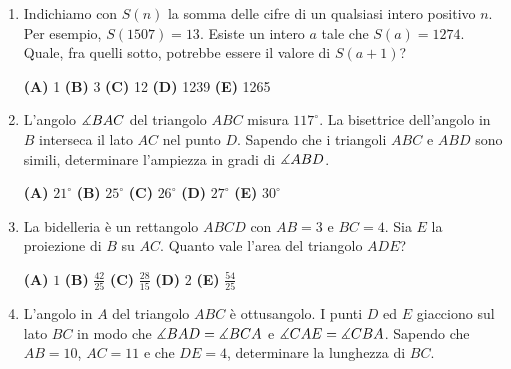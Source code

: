 \documentclass{article}
\begin{document}
\begin{enumerate}
	\item Indichiamo con $S(n)$ la somma delle cifre di un qualsiasi intero
		positivo $n$.
		Per esempio, $S(1507)=13$. Esiste un intero $a$
		tale che $S(a)=1274$. Quale, fra quelli sotto, potrebbe essere
		il valore di $S(a+1)$?

		\vspace{0.15cm}
		\textbf{(A)} 1 \hspace{0.5cm}
		\textbf{(B)} 3 \hspace{0.5cm}
		\textbf{(C)} 12 \hspace{0.5cm}
		\textbf{(D)} 1239 \hspace{0.5cm}
		\textbf{(E)} 1265 \hspace{0.5cm}

	
	\item L'angolo $\measuredangle{BAC}$ del triangolo $ABC$ misura $117^\circ$.
		La bisettrice dell'angolo in $B$ interseca il lato $AC$ nel punto $D$.
		Sapendo che i triangoli $ABC$ e $ABD$ sono simili, determinare
		l'ampiezza in gradi di $\measuredangle{ABD}$.

		\vspace{0.15cm}
		\textbf{(A)} $21^\circ$ \hspace{0.5cm}
		\textbf{(B)} $25^\circ$ \hspace{0.5cm}
		\textbf{(C)} $26^\circ$ \hspace{0.5cm}
		\textbf{(D)} $27^\circ$ \hspace{0.5cm}
		\textbf{(E)} $30^\circ$ \hspace{0.5cm}

	\item La bidelleria è un rettangolo $ABCD$ con $AB=3$ e $BC=4$. Sia $E$ la
		proiezione di $B$ su $AC$. Quanto vale l'area del triangolo $ADE$?

		\vspace{0.15cm}
		\textbf{(A)} $1$ \hspace{0.5cm}
		\textbf{(B)} $\frac{42}{25}$ \hspace{0.5cm}
		\textbf{(C)} $\frac{28}{15}$ \hspace{0.5cm}
		\textbf{(D)} $2$ \hspace{0.5cm}
		\textbf{(E)} $\frac{54}{25}$ \hspace{0.5cm}

	\item L'angolo in $A$ del triangolo $ABC$ è ottusangolo. I punti
		$D$ ed $E$ giacciono sul lato $BC$ in modo che $\measuredangle{BAD}=\measuredangle{BCA}$
		e $\measuredangle{CAE}=\measuredangle{CBA}$. Sapendo che $AB=10$, $AC=11$ e che $DE=4$,
		determinare la lunghezza di $BC$.


\end{enumerate}
\end{document}
